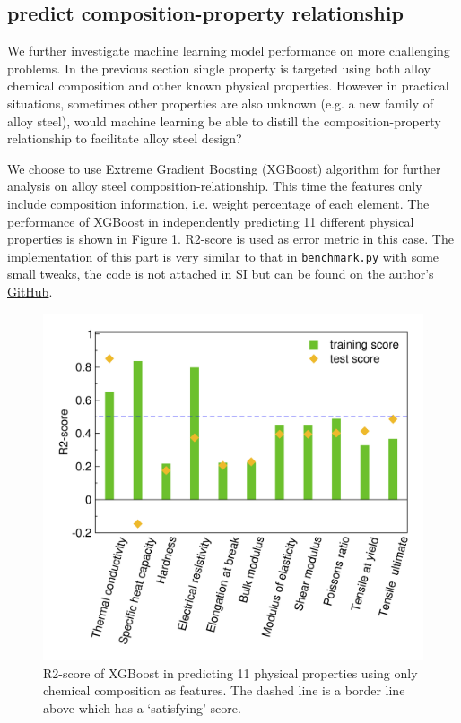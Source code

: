 \documentclass[10pt,aps,prb,amsmath,amssymb,twocolumn,letterpaper,nobalancelastpage,final,citeautoscript,floatfix,raggedbottom,superscriptaddress]{revtex4-1}
\begin{document}
\subsection{predict composition-property relationship}

We further investigate machine learning model performance on more challenging problems. In the previous section single property is targeted using both alloy chemical composition and other known physical properties. However in practical situations, sometimes other properties are also unknown (e.g. a new family of alloy steel), would machine learning be able to distill the composition-property relationship to facilitate alloy steel design?

We choose to use Extreme Gradient Boosting (XGBoost) algorithm for further analysis on alloy steel composition-relationship. This time the features only include composition information, i.e. weight percentage of each element. The performance of XGBoost in independently predicting 11 different physical properties is shown in Figure \ref{fig:compo-prop}. R2-score is used as error metric in this case. The implementation of this part is very similar to that in \hyperlink{ml}{\texttt{benchmark.py}} with some small tweaks, the code is not attached in SI but can be found on the author's \href{https://github.com/raymond931118/scraping}{GitHub}.

\begin{figure}[h]
  \center
  \vspace{-1mm}
 \includegraphics[width=0.95\linewidth]{figures/compo-prop.png}
  \caption{R2-score of XGBoost in predicting 11 physical properties using only chemical composition as features. The dashed line is a border line above which has a `satisfying' score. }
  \label{fig:compo-prop}
\end{figure}
\end{document}
